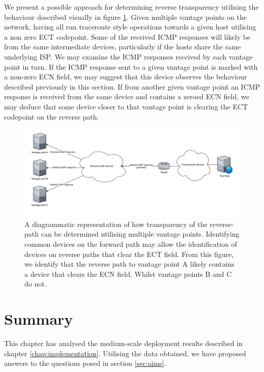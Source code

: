 \documentclass{l4proj}
\begin{document}
We present a possible approach for determining reverse transparency utilising the behaviour described visually in figure \ref{fig:reverse}. Given multiple vantage points on the network, having all run traceroute style operations towards a given host utilising a non zero ECT codepoint. Some of the received ICMP responses will likely be from the same intermediate devices, particularly if the hosts share the same underlying ISP. We may examine the ICMP responses received by each vantage point in turn. If the ICMP response sent to a given vantage point is marked with a non-zero ECN field, we may suggest that this device observes the behaviour described previously in this section. If from another given vantage point an ICMP response is received from the same device and contains a zeroed ECN field, we may deduce that some device closer to that vantage point is clearing the ECT codepoint on the reverse path.

\begin{figure}[H]
    \centering
    \includegraphics[scale=0.5]{dissertation/images/reversepath.pdf}
    \caption{A diagrammatic representation of how transparency of the reverse-path can be determined utilising multiple vantage points. Identifying common devices on the forward path may allow the identification of devices on reverse paths that clear the ECT field. From this figure, we identify that the reverse path to vantage point A likely contains a device that clears the ECN field. Whilst vantage points B and C do not.}
    \label{fig:reverse}
\end{figure}

\section{Summary}

This chapter has analysed the medium-scale deployment results described in chapter \ref{chap:implementation}. Utilising the data obtained, we have proposed answers to the questions posed in section \ref{sec:aims}.
\end{document}
